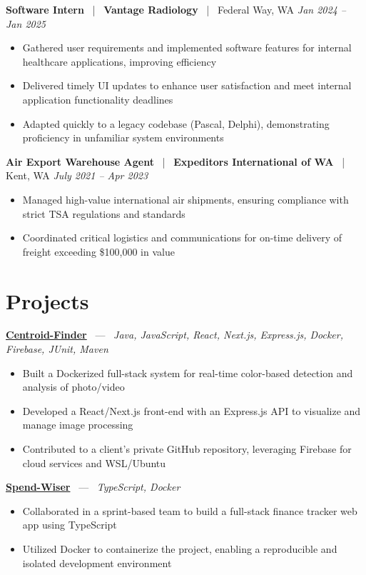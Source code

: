 \documentclass[10pt, letterpaper]{article}
\newcommand{\jobhead}[4]{%
  \vspace{5pt}%
  {\bfseries\color{dark}#1}%
  ~{\color{light}|}~%
  {\bfseries\color{navy}#2}%
  ~{\color{light}|}~%
  {\color{light}#3}%
  \hfill{\color{light}\small\textit{#4}}\\[-2pt]%
}
\newcommand{\projhead}[3]{%
  \vspace{5pt}%
  {\bfseries\color{dark}\href{#2}{#1}}%
  ~{\color{light}---}~%
  {\color{light}\small\textit{#3}}\\[-2pt]%
}
\begin{document}
\jobhead{Software Intern}{Vantage Radiology}{Federal Way, WA}{Jan 2024 – Jan 2025}
\begin{itemize}
  \item Gathered user requirements and implemented software features for internal healthcare applications, improving efficiency
  \item Delivered timely UI updates to enhance user satisfaction and meet internal application functionality deadlines
  \item Adapted quickly to a legacy codebase (Pascal, Delphi), demonstrating proficiency in unfamiliar system environments
\end{itemize}

\jobhead{Air Export Warehouse Agent}{Expeditors International of WA}{Kent, WA}{July 2021 – Apr 2023}
\begin{itemize}
  \item Managed high-value international air shipments, ensuring compliance with strict TSA regulations and standards
  \item Coordinated critical logistics and communications for on-time delivery of freight exceeding \$100,000 in value
\end{itemize}

\section{Projects}

\projhead{Centroid-Finder}{https://github.com/xavierb117/centroid-finder}{Java, JavaScript, React, Next.js, Express.js, Docker, Firebase, JUnit, Maven}
\begin{itemize}
  \item Built a Dockerized full-stack system for real-time color-based detection and analysis of photo/video
  \item Developed a React/Next.js front-end with an Express.js API to visualize and manage image processing
  \item Contributed to a client's private GitHub repository, leveraging Firebase for cloud services and WSL/Ubuntu
\end{itemize}

\projhead{Spend-Wiser}{https://github.com/JesseChum/w26-sdev372-spendwiser-finance-tracker}{TypeScript, Docker}
\begin{itemize}
  \item Collaborated in a sprint-based team to build a full-stack finance tracker web app using TypeScript
  \item Utilized Docker to containerize the project, enabling a reproducible and isolated development environment
\end{itemize}
\end{document}
